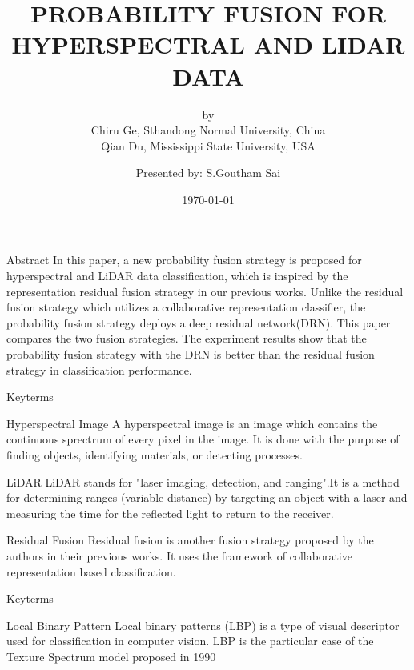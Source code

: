 \documentclass{beamer}
\title{PROBABILITY FUSION FOR HYPERSPECTRAL AND LIDAR DATA}
\subtitle{by \\ Chiru Ge, Sthandong Normal University, China \\Qian Du, Mississippi State University, USA}
\author{Presented by: S.Goutham Sai}
\institute{IITH(CSE)}
\date{\today}
\begin{document}
\begin{frame}
    \titlepage
\end{frame}

\begin{frame}{Abstract}
    In this paper, a new probability fusion strategy is proposed for hyperspectral and LiDAR data classification, which is inspired by the representation residual fusion strategy in our previous works. Unlike the residual fusion strategy which utilizes a collaborative representation classifier, the probability fusion strategy deploys a deep residual network(DRN). This paper compares the two fusion strategies. The experiment results show that the probability fusion strategy with the DRN is better than the residual fusion strategy in classification performance.
\end{frame}

\begin{frame}{Keyterms}
      \begin{block}{Hyperspectral Image}
        A hyperspectral image is an image which contains the continuous sprectrum of every pixel in the image. It is done with the purpose of finding objects, identifying materials, or detecting processes.
    \end{block}
      \begin{block}{LiDAR}
        LiDAR stands for "laser imaging, detection, and ranging".It is a method for determining ranges (variable distance) by targeting an object with a laser and measuring the time for the reflected light to return to the receiver.     
      \end{block}
      \begin{block}{Residual Fusion}
        Residual fusion is another fusion strategy proposed by the authors in their previous works. It uses the framework of collaborative representation based classification. 
    \end{block}
\end{frame}

\begin{frame}{Keyterms}
    \begin{block}{Local Binary Pattern}
        Local binary patterns (LBP) is a type of visual descriptor used for classification in computer vision. LBP is the particular case of the Texture Spectrum model proposed in 1990
    \end{block}
\end{frame}
\end{document}
